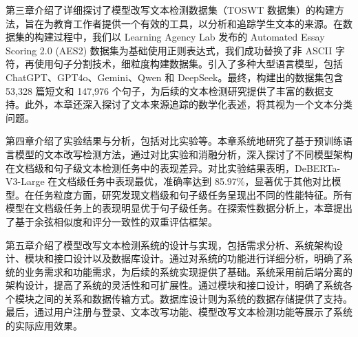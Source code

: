 第三章介绍了详细探讨了模型改写文本检测数据集（TOSWT 数据集）的构建方法，旨在为教育工作者提供一个有效的工具，以分析和追踪学生文本的来源。在数据集的构建过程中，我们以 Learning Agency Lab 发布的 Automated Essay Scoring 2.0 (AES2) 数据集为基础使用正则表达式，我们成功替换了非 ASCII 字符，再使用句子分割技术，细粒度构建数据集。引入了多种大型语言模型，包括 ChatGPT、GPT4o、Gemini、Qwen 和 DeepSeek。最终，构建出的数据集包含 53,328 篇短文和 147,976 个句子，为后续的文本检测研究提供了丰富的数据支持。此外，本章还深入探讨了文本来源追踪的数学化表述，将其视为一个文本分类问题。

第四章介绍了实验结果与分析，包括对比实验等。本章系统地研究了基于预训练语言模型的文本改写检测方法，通过对比实验和消融分析，深入探讨了不同模型架构在文档级和句子级文本检测任务中的表现差异。对比实验结果表明，DeBERTa-V3-Large 在文档级任务中表现最优，准确率达到 85.97\%，显著优于其他对比模型。在任务粒度方面，研究发现文档级和句子级任务呈现出不同的性能特征。所有模型在文档级任务上的表现明显优于句子级任务。在探索性数据分析上，本章提出了基于余弦相似度和评分一致性的双重评估框架。

第五章介绍了模型改写文本检测系统的设计与实现，包括需求分析、系统架构设计、模块和接口设计以及数据库设计。通过对系统的功能进行详细分析，明确了系统的业务需求和功能需求，为后续的系统实现提供了基础。系统采用前后端分离的架构设计，提高了系统的灵活性和可扩展性。通过模块和接口设计，明确了系统各个模块之间的关系和数据传输方式。数据库设计则为系统的数据存储提供了支持。最后，通过用户注册与登录、文本改写功能、模型改写文本检测功能等展示了系统的实际应用效果。